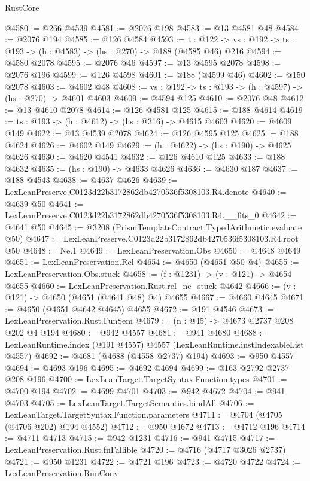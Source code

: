 \begin{lexlean}{RustCore}
\begin{coremodule}
@4580 := @266 @4539
@4581 := @2076 @198
@4583 := @13 @4581 @48
@4584 := @2076 @194
@4585 := @126 @4584
@4593 := {t : @122} ->
  {vs : @192} -> {ts : @193} -> (h : @4583) -> (hs : @270) -> @188 (@4585 @46) @216
@4594 := @4580 @2078
@4595 := @2076 @46
@4597 := @13 @4595 @2078
@4598 := @2076 @196
@4599 := @126 @4598
@4601 := @188 (@4599 @46)
@4602 := @150 @2078
@4603 := @4602 @48
@4608 := {vs : @192} -> {ts : @193} -> (h : @4597) -> (hs : @270) -> @4601 @4603
@4609 := @4594 @125
@4610 := @2076 @48
@4612 := @13 @4610 @2078
@4614 := @126 @4581 @125
@4615 := @188 @4614
@4619 := {ts : @193} -> (h : @4612) -> (hs : @316) -> @4615 @4603
@4620 := @4609 @149
@4622 := @13 @4539 @2078
@4624 := @126 @4595 @125
@4625 := @188 @4624
@4626 := @4602 @149
@4629 := (h : @4622) -> (hs : @190) -> @4625 @4626
@4630 := @4620 @4541
@4632 := @126 @4610 @125
@4633 := @188 @4632
@4635 := (hs : @190) -> @4633 @4626
@4636 := @4630 @187
@4637 := @188 @4543
@4638 := @4637 @4626
@4639 := LexLeanPreserve.C0123d22b3172862db4270536f5308103.R4.denote
@4640 := @4639 @50
@4641 := LexLeanPreserve.C0123d22b3172862db4270536f5308103.R4.__fits_0
@4642 := @4641 @50
@4645 := @3208 (PrismTemplateContract.TypedArithmetic.evaluate @50)
@4647 := LexLeanPreserve.C0123d22b3172862db4270536f5308103.R4.root @50
@4648 := Ne.{1}
@4649 := LexLeanPreservation.Obs
@4650 := @4648 @4649
@4651 := LexLeanPreservation.Rel
@4654 := @4650 (@4651 @50 @4)
@4655 := LexLeanPreservation.Obs.stuck
@4658 := (f : @1231) -> (v : @121) -> @4654 @4655
@4660 := LexLeanPreservation.Rust.rel_ne_stuck @4642
@4666 := (v : @121) -> @4650 (@4651 (@4641 @48) @4) @4655
@4667 := @4660 @4645
@4671 := @4650 (@4651 @4642 @4645) @4655
@4672 := @191 @4546
@4673 := LexLeanPreservation.Rust.FunSem
@4679 := (n : @45) -> @4673 @2737 @208 @202 @4 @194
@4680 := @942 @4557
@4681 := @941 @4680
@4688 := LexLeanRuntime.index (@191 @4557) @4557 (LexLeanRuntime.instIndexableList @4557)
@4692 := @4681 (@4688 (@4558 @2737) @194)
@4693 := @950 @4557
@4694 := @4693 @196
@4695 := @4692 @4694
@4699 := @163 @2792 @2737 @208 @196
@4700 := LexLeanTarget.TargetSyntax.Function.types
@4701 := @4700 @194
@4702 := @4699 @4701
@4703 := @942 @4672
@4704 := @941 @4703
@4705 := LexLeanTarget.TargetSemantics.bindAll
@4706 := LexLeanTarget.TargetSyntax.Function.parameters
@4711 := @4704 (@4705 (@4706 @202) @194 @4552)
@4712 := @950 @4672
@4713 := @4712 @196
@4714 := @4711 @4713
@4715 := @942 @1231
@4716 := @941 @4715
@4717 := LexLeanPreservation.Rust.fnFallible
@4720 := @4716 (@4717 @3026 @2737)
@4721 := @950 @1231
@4722 := @4721 @196
@4723 := @4720 @4722
@4724 := LexLeanPreservation.RunConv

\end{coremodule}
\end{lexlean}
